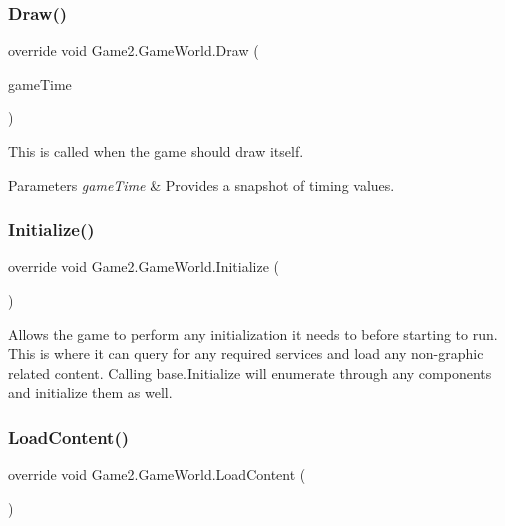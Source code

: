 \subsubsection{\texorpdfstring{Draw()}{Draw()}}
{\footnotesize\ttfamily override void Game2.\+Game\+World.\+Draw (\begin{DoxyParamCaption}\item[{Game\+Time}]{game\+Time }\end{DoxyParamCaption})\hspace{0.3cm}{\ttfamily [protected]}}



This is called when the game should draw itself. 


\begin{DoxyParams}{Parameters}
{\em game\+Time} & Provides a snapshot of timing values.\\
\hline
\end{DoxyParams}
\mbox{\label{class_game2_1_1_game_world_a8488fd97f682ca3cc0d3defe5094bb7f}} 
\subsubsection{\texorpdfstring{Initialize()}{Initialize()}}
{\footnotesize\ttfamily override void Game2.\+Game\+World.\+Initialize (\begin{DoxyParamCaption}{ }\end{DoxyParamCaption})\hspace{0.3cm}{\ttfamily [protected]}}



Allows the game to perform any initialization it needs to before starting to run. This is where it can query for any required services and load any non-\/graphic related content. Calling base.\+Initialize will enumerate through any components and initialize them as well. 

\mbox{\label{class_game2_1_1_game_world_a4bf53e37ff1497b08076b29ba9cc6494}} 
\subsubsection{\texorpdfstring{Load\+Content()}{LoadContent()}}
{\footnotesize\ttfamily override void Game2.\+Game\+World.\+Load\+Content (\begin{DoxyParamCaption}{ }\end{DoxyParamCaption})\hspace{0.3cm}{\ttfamily [protected]}}



